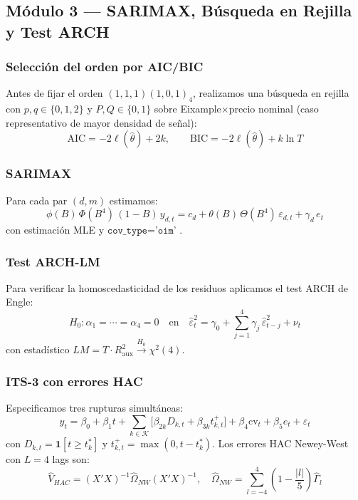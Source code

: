 \documentclass[10pt,a4paper,twocolumn]{article}
\begin{document}
\subsection{Módulo 3 — SARIMAX, Búsqueda en Rejilla y Test ARCH}

\subsubsection{Selección del orden por AIC/BIC}

Antes de fijar el orden $(1,1,1)(1,0,1)_4$, realizamos una búsqueda en rejilla con
$p,q \in \{0,1,2\}$ y $P,Q \in \{0,1\}$ sobre Eixample$\times$precio nominal
(caso representativo de mayor densidad de señal):
\begin{equation}
  \text{AIC} = -2\ell(\hat{\theta}) + 2k, \qquad
  \text{BIC} = -2\ell(\hat{\theta}) + k\ln T
  \label{eq:aic}
\end{equation}

\subsubsection{SARIMAX}

Para cada par $(d,m)$ estimamos:
\begin{equation}
  \phi(B)\,\Phi(B^4)\,(1{-}B)\,y_{d,t}
  = c_d + \theta(B)\,\Theta(B^4)\,\varepsilon_{d,t} + \gamma_d\,e_t
  \label{eq:sarimax}
\end{equation}
con estimación MLE y $\texttt{cov\_type='oim'}$ \citep{harvey1989forecasting}.

\subsubsection{Test ARCH-LM}

Para verificar la homoscedasticidad de los residuos aplicamos el test ARCH de Engle:
\begin{equation}
  H_0: \alpha_1 = \cdots = \alpha_4 = 0 \quad
  \text{en} \quad \hat\varepsilon_t^2 = \gamma_0
  + \sum_{j=1}^4 \gamma_j\,\hat\varepsilon_{t-j}^2 + \nu_t
  \label{eq:arch}
\end{equation}
con estadístico $LM = T \cdot R^2_\text{aux} \xrightarrow{H_0} \chi^2(4)$.

\subsubsection{ITS-3 con errores HAC}

Especificamos tres rupturas simultáneas:
\begin{equation}
  y_t = \beta_0 + \beta_1 t
  + \sum_{k \in \mathcal{K}}\!\bigl[\beta_{2k} D_{k,t}
    + \beta_{3k} t_{k,t}^+\bigr]
  + \beta_4\text{cv}_t + \beta_5 e_t + \varepsilon_t
  \label{eq:its3}
\end{equation}
con $D_{k,t}{=}\mathbf{1}[t{\geq}t_k^*]$ y $t_{k,t}^+{=}\max(0,t{-}t_k^*)$.
Los errores HAC Newey-West con $L{=}4$ lags son:
\begin{equation}
  \hat{V}_{HAC} = (X'X)^{-1}\hat{\Omega}_{NW}(X'X)^{-1}, \quad
  \hat{\Omega}_{NW} = \sum_{l=-4}^4\!\left(1-\frac{|l|}{5}\right)\!\hat\Gamma_l
  \label{eq:hac}
\end{equation}
\end{document}

